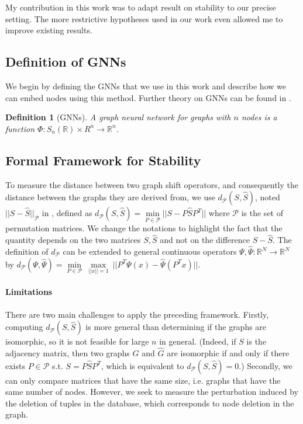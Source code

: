\documentclass[11pt,a4paper]{article}
\newcommand{\bb}[1]{\mathbb{#1}}
\newcommand{\R}{\bb{R}}
\newcommand{\cP}{\mathcal{P}}
\newtheorem{definition}{Definition}
\theoremstyle{definition}
\begin{document}
	My contribution in this work was to adapt result on stability to our precise setting. The more restrictive hypotheses used in our work even allowed me to improve existing results.

\subsection{Definition of GNNs}

	We begin by defining the GNNs that we use in this work and describe how we can embed nodes using this method. Further theory on GNNs can be found in .

	\begin{definition}[GNNs]
	
		A graph neural network for graphs with $n$ nodes is a function $\Phi: S_n(\R) \times R^n \to \R^n$.
	
	\end{definition}

\subsection{Formal Framework for Stability}

To measure the distance between two graph shift operators, and consequently the distance between the graphs they are derived from, we use $d_{\cP}(S, \hat{S})$, noted $||S - \hat{S}||_\cP$ in ,  defined as $d_\cP(S,\hat{S})=\underset{P \in \cP}{\min} ||S-P \hat{S} P^T ||$ where $\cP$ is the set of permutation matrices. We change the notations to highlight the fact that the quantity depends on the two matrices $S,\hat{S}$ and not on the difference $S-\hat{S}$. The definition of $d_\cP$ can be extended to general continuous operators $\Psi, \hat{\Psi}: \mathbb{R}^N \to \mathbb{R}^N$ by $d_\cP (\Psi, \hat{\Psi}) = \underset{P \in \cP}{\min} \ \underset{||x|| = 1}{\max} \ || P^T \Psi (x) - \hat{\Psi}(P^T x) ||$.

        
\paragraph{Limitations} There are two main challenges to apply the preceding framework. Firstly, computing $d_\cP(S,\hat{S})$ is more general than determining if the graphs are isomorphic, so it is not feasible for large $n$ in general. (Indeed, if $S$ is the adjacency matrix, then two graphs $G$ and $\hat{G}$ are isomorphic if and only if there exists $P \in \cP$ s.t. $S=P \hat{S} P^T$, which is equivalent to $d_\cP(S,\hat{S})=0$.) Secondly, we can only compare matrices that have the same size, i.e. graphs that have the same number of nodes. However, we seek to measure the perturbation induced by the deletion of tuples in the database, which corresponds to node deletion in the graph.
\end{document}
